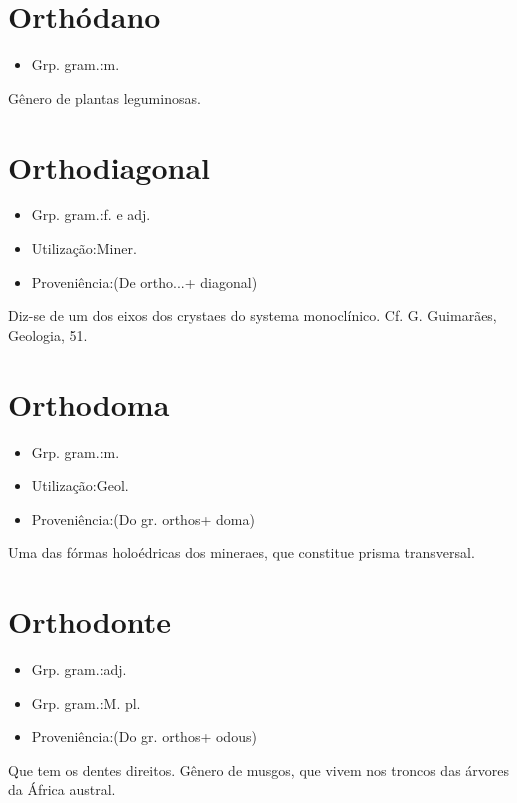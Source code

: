 \section{Orthódano}
\begin{itemize}
\item {Grp. gram.:m.}
\end{itemize}
Gênero de plantas leguminosas.
\section{Orthodiagonal}
\begin{itemize}
\item {Grp. gram.:f.  e  adj.}
\end{itemize}
\begin{itemize}
\item {Utilização:Miner.}
\end{itemize}
\begin{itemize}
\item {Proveniência:(De \textunderscore ortho...\textunderscore  + \textunderscore diagonal\textunderscore )}
\end{itemize}
Diz-se de um dos eixos dos crystaes do systema monoclínico. Cf. G. Guimarães, \textunderscore Geologia\textunderscore , 51.
\section{Orthodoma}
\begin{itemize}
\item {Grp. gram.:m.}
\end{itemize}
\begin{itemize}
\item {Utilização:Geol.}
\end{itemize}
\begin{itemize}
\item {Proveniência:(Do gr. \textunderscore orthos\textunderscore  + \textunderscore doma\textunderscore )}
\end{itemize}
Uma das fórmas holoédricas dos mineraes, que constitue prisma transversal.
\section{Orthodonte}
\begin{itemize}
\item {Grp. gram.:adj.}
\end{itemize}
\begin{itemize}
\item {Grp. gram.:M. pl.}
\end{itemize}
\begin{itemize}
\item {Proveniência:(Do gr. \textunderscore orthos\textunderscore  + \textunderscore odous\textunderscore )}
\end{itemize}
Que tem os dentes direitos.
Gênero de musgos, que vivem nos troncos das árvores da África austral.
